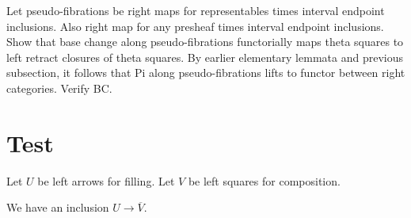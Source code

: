 \documentclass[reqno,10pt,a4paper,oneside]{amsart}
\begin{document}
Let pseudo-fibrations be right maps for representables times interval endpoint inclusions.
Also right map for any presheaf times interval endpoint inclusions.
Show that base change along pseudo-fibrations functorially maps theta squares to left retract closures of theta squares.
By earlier elementary lemmata and previous subsection, it follows that Pi along pseudo-fibrations lifts to functor between right categories.
Verify BC.

\section{Test}

Let $U$ be left arrows for filling.
Let $V$ be left squares for composition.

We have an inclusion $U \to \overline{V}$.




\end{document}
